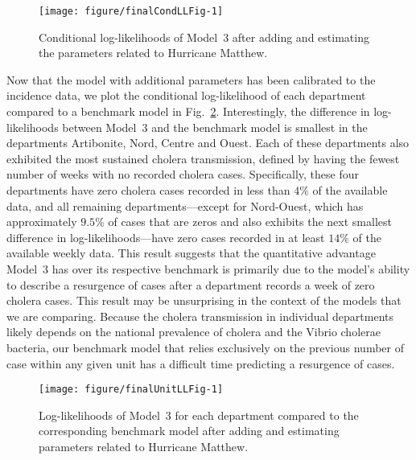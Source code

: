 \begin{figure}[!ht]
\begin{knitrout}
\color{fgcolor}

{\centering \texttt{[image: figure/finalCondLLFig-1]} 

}


\end{knitrout}
\caption{\label{fig:finalCondLL}Conditional log-likelihoods of Model~3 after adding and estimating the parameters related to Hurricane Matthew.}
\end{figure}

Now that the model with additional parameters has been calibrated to the incidence data, we plot the conditional log-likelihood of each department compared to a benchmark model in Fig.~\ref{fig:finalUnitLL}.
Interestingly, the difference in log-likelihoods between Model~3 and the benchmark model is smallest in the departments Artibonite, Nord, Centre and Ouest.
Each of these departments also exhibited the most sustained cholera transmission, defined by having the fewest number of weeks with no recorded cholera cases.
Specifically, these four departments have zero cholera cases recorded in less than $4\%$ of the available data, and all remaining departments---except for Nord-Ouest, which has approximately $9.5\%$ of cases that are zeros and also exhibits the next smallest difference in log-likelihoods---have zero cases recorded in at least $14\%$ of the available weekly data.
This result suggests that the quantitative advantage Model~3 has over its respective benchmark is primarily due to the model's ability to describe a resurgence of cases after a department records a week of zero cholera cases.
This result may be unsurprising in the context of the models that we are comparing.
Because the cholera transmission in individual departments likely depends on the national prevalence of cholera and the Vibrio cholerae bacteria, our benchmark model that relies exclusively on the previous number of case within any given unit has a difficult time predicting a resurgence of cases.

\begin{figure}[!ht]
\begin{knitrout}
\color{fgcolor}

{\centering \texttt{[image: figure/finalUnitLLFig-1]} 

}


\end{knitrout}
\caption{\label{fig:finalUnitLL}Log-likelihoods of Model~3 for each department compared to the corresponding benchmark model after adding and estimating parameters related to Hurricane Matthew.}
\end{figure}

